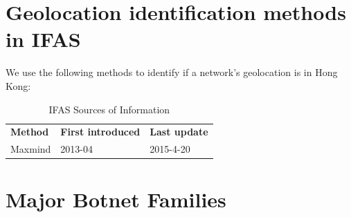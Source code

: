 \documentclass[12pt]{article}
\begin{document}
\FloatBarrier

\section{Geolocation identification methods in IFAS}
We use the following methods to identify if a network's geolocation is in Hong Kong:
\begin{table}[!htbp]
\centering
\caption{IFAS Sources of Information}
\begin{tabular}{lll}
\hline
{\bf Method} & {\bf First introduced} & \bf Last update                                                                         \\\hhline{===}

Maxmind & 2013-04 & 2015-4-20
\\\hline
\end{tabular}
\end{table}
\newpage


\section{Major Botnet Families}
\end{document}
